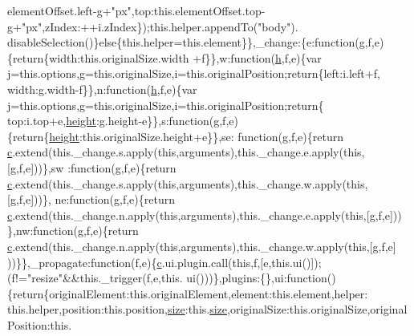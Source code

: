 \begin{DoxyCode}
      elementOffset.left-g+\textcolor{stringliteral}{"px"},top:this.elementOffset.top-g+\textcolor{stringliteral}{"px"},zIndex:++i.zIndex\});this.helper.appendTo(\textcolor{stringliteral}{"body"}).
      disableSelection()\}\textcolor{keywordflow}{else}\{this.helper=this.element\}\},\_change:\{e:\textcolor{keyword}{function}(g,f,e)\{\textcolor{keywordflow}{return}\{width:this.originalSize.width
      +f\}\},w:\textcolor{keyword}{function}(\hyperlink{all__1a_8js_aebecdaf2444e2be39f4804412d6a3bf8}{h},f,e)\{var j=this.options,g=this.originalSize,i=this.originalPosition;\textcolor{keywordflow}{return}\{left:i.left+f,
      width:g.width-f\}\},n:\textcolor{keyword}{function}(\hyperlink{all__1a_8js_aebecdaf2444e2be39f4804412d6a3bf8}{h},f,e)\{var j=this.options,g=this.originalSize,i=this.originalPosition;\textcolor{keywordflow}{return}\{
      top:i.top+e,\hyperlink{styr_2styr_2main_8c_a48083b65ac9a863566dc3e3fff09a5b4}{height}:g.height-e\}\},s:\textcolor{keyword}{function}(g,f,e)\{\textcolor{keywordflow}{return}\{\hyperlink{styr_2styr_2main_8c_a48083b65ac9a863566dc3e3fff09a5b4}{height}:this.originalSize.height+e\}\},se:\textcolor{keyword}{
      function}(g,f,e)\{\textcolor{keywordflow}{return} \hyperlink{jquery_8js_ad171626e81625b5e9f5cb177a3a8fb1c}{c}.extend(this.\_change.s.apply(\textcolor{keyword}{this},arguments),this.\_change.e.apply(\textcolor{keyword}{this},[g,f,e]))\},sw
      :\textcolor{keyword}{function}(g,f,e)\{\textcolor{keywordflow}{return} \hyperlink{jquery_8js_ad171626e81625b5e9f5cb177a3a8fb1c}{c}.extend(this.\_change.s.apply(\textcolor{keyword}{this},arguments),this.\_change.w.apply(\textcolor{keyword}{this},[g,f,e]))\},
      ne:\textcolor{keyword}{function}(g,f,e)\{\textcolor{keywordflow}{return} \hyperlink{jquery_8js_ad171626e81625b5e9f5cb177a3a8fb1c}{c}.extend(this.\_change.n.apply(\textcolor{keyword}{this},arguments),this.\_change.e.apply(\textcolor{keyword}{this},[g,f,e]))
      \},nw:\textcolor{keyword}{function}(g,f,e)\{\textcolor{keywordflow}{return} \hyperlink{jquery_8js_ad171626e81625b5e9f5cb177a3a8fb1c}{c}.extend(this.\_change.n.apply(\textcolor{keyword}{this},arguments),this.\_change.w.apply(\textcolor{keyword}{this},[g,f,e]
      ))\}\},\_propagate:\textcolor{keyword}{function}(f,e)\{\hyperlink{jquery_8js_ad171626e81625b5e9f5cb177a3a8fb1c}{c}.ui.plugin.call(\textcolor{keyword}{this},f,[e,this.ui()]);(f!=\textcolor{stringliteral}{"resize"}&&this.\_trigger(f,e,this.
      ui()))\},plugins:\{\},ui:\textcolor{keyword}{function}()\{\textcolor{keywordflow}{return}\{originalElement:this.originalElement,element:this.element,helper:
      this.helper,position:this.position,\hyperlink{all__15_8js_acbd9773931ec61196e11d59d52b43cb3}{size}:this.\hyperlink{all__15_8js_acbd9773931ec61196e11d59d52b43cb3}{size},originalSize:this.originalSize,originalPosition:this.

\end{DoxyCode}
